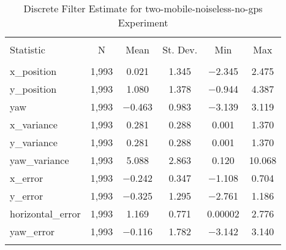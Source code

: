 
\begin{table}[h] \centering 
  \caption{Discrete Filter Estimate for two-mobile-noiseless-no-gps Experiment} 
  \label{tab:two_mobile_noiseless_no_gps_discrete_summary} 
\begin{tabular}{@{\extracolsep{5pt}}lccccc} 
\\[-1.8ex]\hline 
\hline \\[-1.8ex] 
Statistic & \multicolumn{1}{c}{N} & \multicolumn{1}{c}{Mean} & \multicolumn{1}{c}{St. Dev.} & \multicolumn{1}{c}{Min} & \multicolumn{1}{c}{Max} \\ 
\hline \\[-1.8ex] 
x\_position & 1,993 & 0.021 & 1.345 & $-$2.345 & 2.475 \\ 
y\_position & 1,993 & 1.080 & 1.378 & $-$0.944 & 4.387 \\ 
yaw & 1,993 & $-$0.463 & 0.983 & $-$3.139 & 3.119 \\ 
x\_variance & 1,993 & 0.281 & 0.288 & 0.001 & 1.370 \\ 
y\_variance & 1,993 & 0.281 & 0.288 & 0.001 & 1.370 \\ 
yaw\_variance & 1,993 & 5.088 & 2.863 & 0.120 & 10.068 \\ 
x\_error & 1,993 & $-$0.242 & 0.347 & $-$1.108 & 0.704 \\ 
y\_error & 1,993 & $-$0.325 & 1.295 & $-$2.761 & 1.186 \\ 
horizontal\_error & 1,993 & 1.169 & 0.771 & 0.00002 & 2.776 \\ 
yaw\_error & 1,993 & $-$0.116 & 1.782 & $-$3.142 & 3.140 \\ 
\hline \\[-1.8ex] 
\end{tabular} 
\end{table} 
